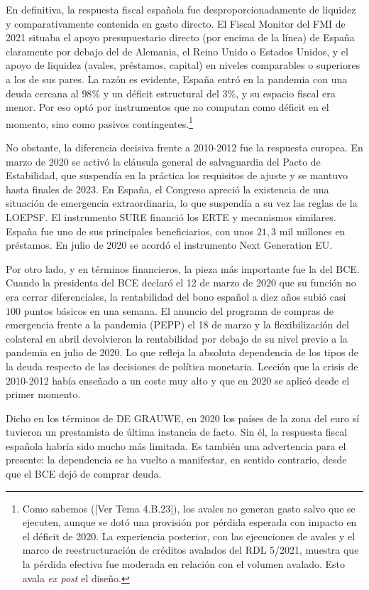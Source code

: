\documentclass[10pt,a4paper]{article}
\newcommand{\authorfont}[1]{{\fontfamily{EBGaramond-TLF}\selectfont #1}}
\begin{document}
En definitiva, la respuesta fiscal española fue desproporcionadamente de liquidez y comparativamente contenida en gasto directo. El Fiscal Monitor del FMI de 2021 situaba el apoyo presupuestario directo (por encima de la línea) de España claramente por debajo del de Alemania, el Reino Unido o Estados Unidos, y el apoyo de liquidez (avales, préstamos, capital) en niveles comparables o superiores a los de sus pares. La razón es evidente, España entró en la pandemia con una deuda cercana al $98\%$ y un déficit estructural del $3\%$, y su espacio fiscal era menor. Por eso optó por instrumentos que no computan como déficit en el momento, sino como pasivos contingentes.\footnote{
Como sabemos ([\authorfont{Ver Tema 4.B.23}]), los avales no generan gasto salvo que se ejecuten, aunque se dotó una provisión por pérdida esperada con impacto en el déficit de 2020. La experiencia posterior, con las ejecuciones de avales y el marco de reestructuración de créditos avalados del RDL 5/2021, muestra que la pérdida efectiva fue moderada en relación con el volumen avalado. Esto avala \textit{ex post} el diseño.
}

No obstante, la diferencia decisiva frente a 2010-2012 fue la respuesta europea. En marzo de 2020 se activó la cláusula general de salvaguardia del Pacto de Estabilidad, que suspendía en la práctica los requisitos de ajuste y se mantuvo hasta finales de 2023. En España, el Congreso apreció la existencia de una situación de emergencia extraordinaria, lo que suspendía a su vez las reglas de la LOEPSF. El instrumento SURE financió los ERTE y mecanismos similares. España fue uno de sus principales beneficiarios, con unos $21,3$ mil millones en préstamos. En julio de 2020 se acordó el instrumento Next Generation EU.

Por otro lado, y en términos financieros, la pieza más importante fue la del BCE. Cuando la presidenta del BCE declaró el 12 de marzo de 2020 que su función no era cerrar diferenciales, la rentabilidad del bono español a diez años subió casi $100$ puntos básicos en una semana. El anuncio del programa de compras de emergencia frente a la pandemia (PEPP) el 18 de marzo y la flexibilización del colateral en abril devolvieron la rentabilidad por debajo de su nivel previo a la pandemia en julio de 2020. Lo que refleja la absoluta dependencia de los tipos de la deuda respecto de las decisiones de política monetaria. Lección que la crisis de 2010-2012 había enseñado a un coste muy alto y que en 2020 se aplicó desde el primer momento.

Dicho en los términos de DE GRAUWE, en 2020 los países de la zona del euro sí tuvieron un prestamista de última instancia de facto. Sin él, la respuesta fiscal española habría sido mucho más limitada. Es también una advertencia para el presente: la dependencia se ha vuelto a manifestar, en sentido contrario, desde que el BCE dejó de comprar deuda.
\end{document}
